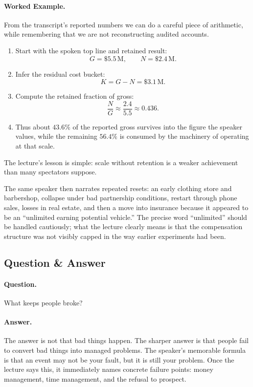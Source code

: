\paragraph{Worked Example.}
From the transcript's reported numbers we can do a careful piece of arithmetic, while remembering that we are not reconstructing audited accounts.
\begin{enumerate}
\item Start with the spoken top line and retained result:
\[
G=\text{\$}5.5\,\mathrm{M},
\qquad
N=\text{\$}2.4\,\mathrm{M}.
\]
\item Infer the residual cost bucket:
\[
K = G-N = \text{\$}3.1\,\mathrm{M}.
\]
\item Compute the retained fraction of gross:
\[
\frac{N}{G} \approx \frac{2.4}{5.5} \approx 0.436.
\]
\item Thus about \(43.6\%\) of the reported gross survives into the figure the speaker values, while the remaining \(56.4\%\) is consumed by the machinery of operating at that scale.
\end{enumerate}
The lecture's lesson is simple: scale without retention is a weaker achievement than many spectators suppose.

The same speaker then narrates repeated resets: an early clothing store and barbershop, collapse under bad partnership conditions, restart through phone sales, losses in real estate, and then a move into insurance because it appeared to be an ``unlimited earning potential vehicle.'' The precise word ``unlimited'' should be handled cautiously; what the lecture clearly means is that the compensation structure was not visibly capped in the way earlier experiments had been.

\subsection{Question \& Answer}

\paragraph{Question.} What keeps people broke?

\paragraph{Answer.} The answer is not that bad things happen. The sharper answer is that people fail to convert bad things into managed problems. The speaker's memorable formula is that an event may not be your fault, but it is still your problem. Once the lecture says this, it immediately names concrete failure points: money management, time management, and the refusal to prospect.

